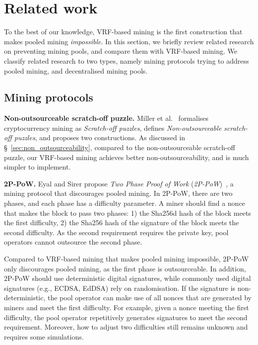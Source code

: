 \section{Related work}

To the best of our knowledge, VRF-based mining is the first construction that makes pooled mining \textit{impossible}.
In this section, we briefly review related research on preventing mining pools, and compare them with VRF-based mining.
We classify related research to two types, namely mining protocols trying to address pooled mining, and decentralised mining pools.

\subsection{Mining protocols}

\textbf{Non-outsourceable scratch-off puzzle.}
Miller et al.~\cite{miller2015nonoutsourceable} formalises cryptocurrency mining as \textit{Scratch-off puzzles}, defines \textit{Non-outsourceable scratch-off puzzles}, and proposes two constructions.
As discussed in \S~\ref{sec:non_outsourceability}, compared to the non-outsourceable scratch-off puzzle, our VRF-based mining achieves better non-outsourceability, and is much simpler to implement.

\textbf{2P-PoW.}
Eyal and Sirer propose \textit{Two Phase Proof of Work} (\textit{2P-PoW})~\cite{2P-PoW}, a mining protocol that discourages pooled mining.
In 2P-PoW, there are two phases, and each phase has a difficulty parameter.
A miner should find a nonce that makes the block to pass two phases: 1) the Sha256d hash of the block meets the first difficulty, 2) the Sha256 hash of the signature of the block meets the second difficulty.
As the second requirement requires the private key, pool operators cannot outsource the second phase.

Compared to VRF-based mining that makes pooled mining impossible, 2P-PoW only discourages pooled mining, as the first phase is outsourceable.
In addition, 2P-PoW should use deterministic digital signatures, while commonly used digital signatures (e.g., ECDSA, EdDSA) rely on randomisation.
If the signature is non-deterministic, the pool operator can make use of all nonces that are generated by miners and meet the first difficulty.
For example, given a nonce meeting the first difficulty, the pool operator repetitively generates signatures to meet the second requirement.
Moreover, how to adjust two difficulties still remains unknown and requires some simulations.





